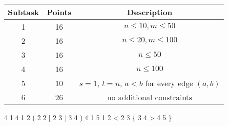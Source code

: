 
\begin{tabular}{|c|c|c|}
	\hline
	Subtask & Points  & Description \\
	\hline
	1 & 16 & $n \leq 10, m\leq 50$ \\
	\hline
	2 & 16 & $n \leq 20, m\leq 100$\\
	\hline
	3 & 16 & $n \leq 50$\\
	\hline
	4 & 16 & $n \leq 100$ \\
	\hline
	5  & 10 & $s = 1$, $t = n$, $a < b$ for every edge $(a,b)$\\
	\hline
	6 & 26  & no additional constraints \\
	\hline
\end{tabular}



 4 1 4
1 2 (
2 2 [
2 3 ]
3 4 )
\sampleEND
{} 4 1 5
1 2 <
2 3 \{
3 4 >
4 5 \}

\sampleEND





